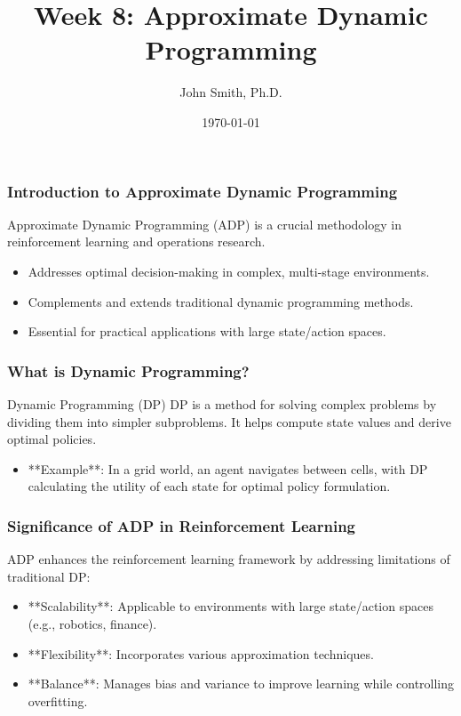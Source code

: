 \documentclass[aspectratio=169]{beamer}
\title[Approximate Dynamic Programming]{Week 8: Approximate Dynamic Programming}
\author[J. Smith]{John Smith, Ph.D.}
\institute[University Name]{
  Department of Computer Science\\
  University Name\\
  \vspace{0.3cm}
  Email: email@university.edu\\
  Website: www.university.edu
}
\date{\today}
\begin{document}
\frame{\titlepage}

\begin{frame}[fragile]
    \frametitle{Introduction to Approximate Dynamic Programming}
    Approximate Dynamic Programming (ADP) is a crucial methodology in reinforcement learning and operations research.
    
    \begin{itemize}
        \item Addresses optimal decision-making in complex, multi-stage environments.
        \item Complements and extends traditional dynamic programming methods.
        \item Essential for practical applications with large state/action spaces.
    \end{itemize}
\end{frame}

\begin{frame}[fragile]
    \frametitle{What is Dynamic Programming?}
    \begin{block}{Dynamic Programming (DP)}
        DP is a method for solving complex problems by dividing them into simpler subproblems. It helps compute state values and derive optimal policies.
    \end{block}
    
    \begin{itemize}
        \item **Example**: In a grid world, an agent navigates between cells, with DP calculating the utility of each state for optimal policy formulation.
    \end{itemize}
\end{frame}

\begin{frame}[fragile]
    \frametitle{Significance of ADP in Reinforcement Learning}
    ADP enhances the reinforcement learning framework by addressing limitations of traditional DP:
    
    \begin{itemize}
        \item **Scalability**: Applicable to environments with large state/action spaces (e.g., robotics, finance).
        \item **Flexibility**: Incorporates various approximation techniques.
        \item **Balance**: Manages bias and variance to improve learning while controlling overfitting.
    \end{itemize}
\end{frame}
\end{document}
